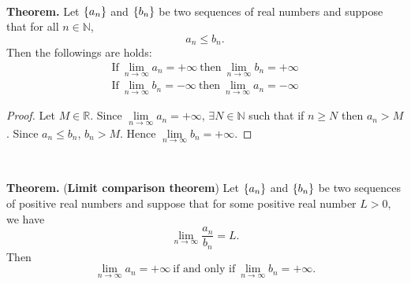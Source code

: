 \documentclass[12pt,a4paper]{article}
\begin{document}
\
\begin{tcolorbox}[colback=white]
	\textbf{Theorem.} Let $\set{a_n}$ and $\set{b_n}$ be two sequences of real numbers and suppose that for all $n\in\mathbb{N}$, \[
	a_n\leq b_n.
	\] Then the followings are holds: \begin{align*}
	\text{If}\ \lim\limits_{n\to\infty}a_n=+\infty\ \text{then}\ \lim\limits_{n\to\infty}b_n=+\infty \\
	\text{If}\ \lim\limits_{n\to\infty}b_n=-\infty\ \text{then}\ \lim\limits_{n\to\infty}a_n=-\infty
	\end{align*}\tcblower\begin{proof}
		Let $M\in\mathbb{R}$. Since $\lim\limits_{n\to\infty}a_n=+\infty$, $\exists N\in\mathbb{N}$ such that if $n\geq N$ then $a_n>M$. Since $a_n\leq b_n$, $b_n>M$. Hence $\lim\limits_{n\to\infty}b_n=+\infty$.
	\end{proof}
\end{tcolorbox}
\
\begin{tcolorbox}[colback=white]
	\textbf{Theorem.} (\textbf{Limit comparison theorem}) Let $\set{a_n}$ and $\set{b_n}$ be two sequences of positive real numbers and suppose that for some positive real number $L>0$, we have \[
	\lim\limits_{n\to\infty}\frac{a_n}{b_n} = L.
	\] Then \[
	\lim\limits_{n\to\infty}a_n=+\infty\ \text{if and only if}\ \lim\limits_{n\to\infty}b_n=+\infty.
	\]
\end{tcolorbox}
\end{document}
